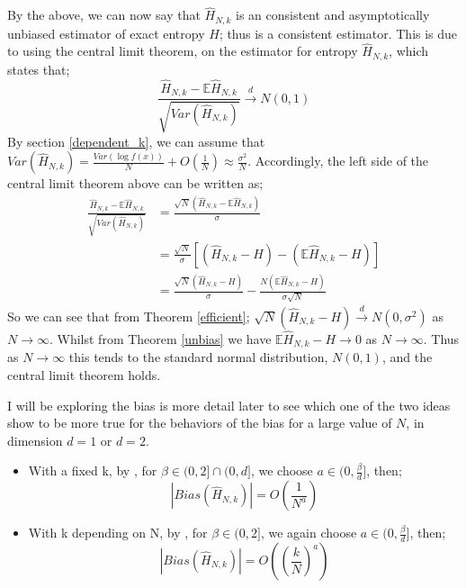 \documentclass{report}
\begin{document}
By the above, we can now say that $\hat{H}_{N, k}$ is an consistent and asymptotically unbiased estimator of exact entropy $H$; thus is a consistent estimator. This is due to using the central limit theorem, on the estimator for entropy $\hat{H}_{N, k}$, which states that;
\begin{equation}
\frac{\hat{H}_{N, k} - \mathbb{E}{\hat{H}_{N, k}}}{\sqrt{Var(\hat{H}_{N, k})}} \xrightarrow{d} N(0, 1) \nonumber
\end{equation}
By section \ref{dependent_k}, we can assume that $Var(\hat{H}_{N, k}) = \frac{Var(\log f(x))}{N} + O(\frac{1}{N}) \approx \frac{\sigma^2}{N}$. Accordingly, the left side of the central limit theorem above can be written as;
\begin{align*}
\frac{\hat{H}_{N, k} - \mathbb{E}{\hat{H}_{N, k}}}{\sqrt{Var(\hat{H}_{N, k})}} &= \frac{\sqrt{N}(\hat{H}_{N, k} - \mathbb{E}{\hat{H}_{N, k}})}{\sigma} \\
&= \frac{\sqrt{N}}{\sigma}[(\hat{H}_{N, k} - H) - (\mathbb{E}{\hat{H}_{N, k}} - H)] \\
&= \frac{\sqrt{N}(\hat{H}_{N, k} - H)}{\sigma} - \frac{N(\mathbb{E}{\hat{H}_{N, k}} - H)}{\sigma \sqrt{N}}
\end{align*}
So we can see that from Theorem \ref{efficient}; $\sqrt{N}(\hat{H}_{N, k} - H) \xrightarrow{d} N(0, \sigma^2)$ as $N \to \infty$. Whilst from Theorem \ref{unbias} we have $\mathbb{E}{\hat{H}_{N, k}} - H  \to 0$ as $N \to \infty$. Thus as $N \to \infty$ this tends to the standard normal distribution, $N(0, 1)$, and the central limit theorem holds.

I will be exploring the bias is more detail later to see which one of the two ideas show to be more true for the behaviors of the bias for a large value of $N$, in dimension $d=1$ or $d=2$. 
\begin{itemize}
\item With a fixed k, by \cite{paper3}, for $\beta \in (0, 2] \cap (0, d]$, we choose $a \in (0, \frac{\beta}{d} ]$, then;
\begin{equation} \label{fixedkbias}
|Bias(\hat{H}_{N, k})| = O \left( \frac{1}{N^{a}} \right)
\end{equation}

\item With k depending on N, by \cite{paper4}, for $\beta \in (0, 2]$, we again choose $a \in (0, \frac{\beta}{d} ]$, then;
 \begin{equation} \label{dependentkbias}
|Bias(\hat{H}_{N, k})| = O\left( \left( \frac{k}{N} \right)^{a} \right)
\end{equation}
\end{itemize}
\end{document}
